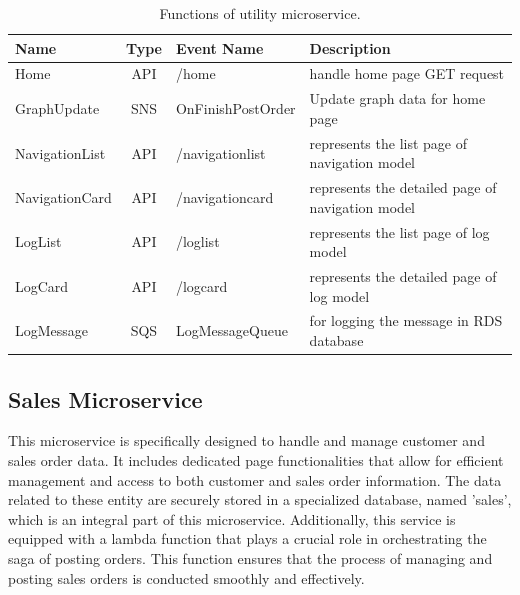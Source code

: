 \begin{table}
    \centering
    \begin{tabular}{|l|c|l|m{5.5cm}|}
        \hline
        \textbf{Name}  & \textbf{Type} & \textbf{Event Name} & \textbf{Description}                             \\ \hline
        Home           & API           & /home               & handle home page GET request                     \\ \hline
        GraphUpdate    & SNS           & OnFinishPostOrder   & Update graph data for home page                  \\ \hline
        NavigationList & API           & /navigationlist     & represents the list page of navigation model     \\ \hline
        NavigationCard & API           & /navigationcard     & represents the detailed page of navigation model \\ \hline
        LogList        & API           & /loglist            & represents the list page of log model            \\ \hline
        LogCard        & API           & /logcard            & represents the detailed page of log model        \\ \hline
        LogMessage     & SQS           & LogMessageQueue     & for logging the message in RDS database          \\ \hline
    \end{tabular}
    \caption{Functions of utility microservice.}
    \label{tab:5_utility_functions}
\end{table}


\subsection{Sales Microservice}
This microservice is specifically designed to handle and manage customer and sales order data. It
includes dedicated page functionalities that allow for efficient management and access to both
customer and sales order information. The data related to these entity are securely stored in a
specialized database, named 'sales', which is an integral part of this microservice. Additionally,
this service is equipped with a lambda function that plays a crucial role in orchestrating the saga
of posting orders. This function ensures that the process of managing and posting sales orders is
conducted smoothly and effectively.

